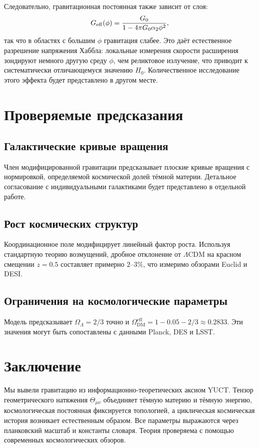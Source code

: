 \documentclass[12pt,a4paper]{article}
\begin{document}
	Следовательно, гравитационная постоянная также зависит от слоя:
	\begin{equation}
		G_{\rm eff}(\phi) = \frac{G_0}{1-4\pi G_0\alpha_2\phi^2},
		\label{eq:Geff-layer}
	\end{equation}
	так что в областях с большим \(\phi\) гравитация слабее. Это даёт естественное разрешение напряжения Хаббла: локальные измерения скорости расширения зондируют немного другую среду \(\phi\), чем реликтовое излучение, что приводит к систематически отличающемуся значению \(H_0\). Количественное исследование этого эффекта будет представлено в другом месте.
	
	\section{Проверяемые предсказания}
	
	\subsection{Галактические кривые вращения}
	Член модифицированной гравитации предсказывает плоские кривые вращения с нормировкой, определяемой космической долей тёмной материи. Детальное согласование с индивидуальными галактиками будет представлено в отдельной работе.
	
	\subsection{Рост космических структур}
	Координационное поле модифицирует линейный фактор роста. Используя стандартную теорию возмущений, дробное отклонение от \(\Lambda\)CDM на красном смещении \(z=0.5\) составляет примерно \(2\)–\(3\%\), что измеримо обзорами Euclid и DESI.
	
	\subsection{Ограничения на космологические параметры}
	Модель предсказывает \(\Omega_\Lambda = 2/3\) точно и \(\Omega_{\mathrm{DM}}^{\mathrm{eff}} = 1 - 0.05 - 2/3 \approx 0.2833\). Эти значения могут быть сопоставлены с данными Planck, DES и LSST.
	
	\section{Заключение}
	Мы вывели гравитацию из информационно-теоретических аксиом YUCT. Тензор геометрического натяжения \(\Theta_{\mu\nu}\) объединяет тёмную материю и тёмную энергию, космологическая постоянная фиксируется топологией, а циклическая космическая история возникает естественным образом. Все параметры выражаются через планковский масштаб и константы словаря. Теория проверяема с помощью современных космологических обзоров.
	
\end{document}
